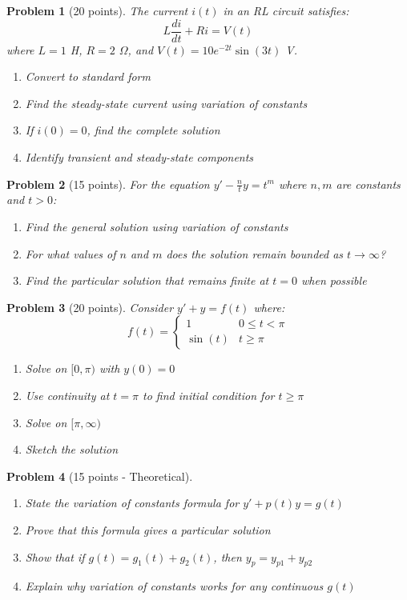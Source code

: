 \documentclass[12pt]{article}
\newtheorem{problem}{Problem}
\begin{document}
\begin{problem}[20 points]
The current $i(t)$ in an RL circuit satisfies:
\[L\frac{di}{dt} + Ri = V(t)\]
where $L = 1$ H, $R = 2$ $\Omega$, and $V(t) = 10e^{-2t}\sin(3t)$ V.
\begin{enumerate}
    \item Convert to standard form
    \item Find the steady-state current using variation of constants
    \item If $i(0) = 0$, find the complete solution
    \item Identify transient and steady-state components
\end{enumerate}
\end{problem}

\begin{problem}[15 points]
For the equation $y' - \frac{n}{t}y = t^m$ where $n, m$ are constants and $t > 0$:
\begin{enumerate}
    \item Find the general solution using variation of constants
    \item For what values of $n$ and $m$ does the solution remain bounded as $t \to \infty$?
    \item Find the particular solution that remains finite at $t = 0$ when possible
\end{enumerate}
\end{problem}

\begin{problem}[20 points]
Consider $y' + y = f(t)$ where:
\[f(t) = \begin{cases}
1 & 0 \leq t < \pi \\
\sin(t) & t \geq \pi
\end{cases}\]
\begin{enumerate}
    \item Solve on $[0, \pi)$ with $y(0) = 0$
    \item Use continuity at $t = \pi$ to find initial condition for $t \geq \pi$
    \item Solve on $[\pi, \infty)$
    \item Sketch the solution
\end{enumerate}
\end{problem}

\begin{problem}[15 points - Theoretical]
\begin{enumerate}
    \item State the variation of constants formula for $y' + p(t)y = g(t)$
    \item Prove that this formula gives a particular solution
    \item Show that if $g(t) = g_1(t) + g_2(t)$, then $y_p = y_{p1} + y_{p2}$
    \item Explain why variation of constants works for any continuous $g(t)$
\end{enumerate}
\end{problem}
\end{document}
